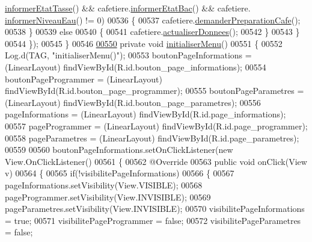 \begin{DoxyCode}
      \hyperlink{classcom_1_1example_1_1ekawa_1_1_cafetiere_ae3c04cc0258cbe554eee5894655c379e}{informerEtatTasse}() && cafetiere.\hyperlink{classcom_1_1example_1_1ekawa_1_1_cafetiere_a1e5aad72cec77a755c8b70eb1be5e6e5}{informerEtatBac}() && cafetiere.
      \hyperlink{classcom_1_1example_1_1ekawa_1_1_cafetiere_ab8113e922056276f8097744991ca76b6}{informerNiveauEau}() != 0)
00536                 \{
00537                     cafetiere.\hyperlink{classcom_1_1example_1_1ekawa_1_1_cafetiere_a76eb3aa494815ac3b43371e21de21db3}{demanderPreparationCafe}();
00538                 \}
00539                 \textcolor{keywordflow}{else}
00540                 \{
00541                     cafetiere.\hyperlink{classcom_1_1example_1_1ekawa_1_1_cafetiere_a1c6b2ea0e069cda876260e18ea8f6e84}{actualiserDonnees}();
00542                 \}
00543             \}
00544         \});
00545     \}
00546 
\hyperlink{classcom_1_1example_1_1ekawa_1_1_ihm_a60968cecc69df879805b531a5f2ae19c}{00550}     \textcolor{keyword}{private} \textcolor{keywordtype}{void} \hyperlink{classcom_1_1example_1_1ekawa_1_1_ihm_a60968cecc69df879805b531a5f2ae19c}{initialiserMenu}()
00551     \{
00552         Log.d(TAG, \textcolor{stringliteral}{"initialiserMenu()"});
00553         boutonPageInformations = (LinearLayout) findViewById(R.id.bouton\_page\_informations);
00554         boutonPageProgrammer = (LinearLayout) findViewById(R.id.bouton\_page\_programmer);
00555         boutonPageParametres = (LinearLayout) findViewById(R.id.bouton\_page\_parametres);
00556         pageInformations = (LinearLayout) findViewById(R.id.page\_informations);
00557         pageProgrammer = (LinearLayout) findViewById(R.id.page\_programmer);
00558         pageParametres = (LinearLayout) findViewById(R.id.page\_parametres);
00559 
00560         boutonPageInformations.setOnClickListener(\textcolor{keyword}{new} View.OnClickListener()
00561         \{
00562             @Override
00563             \textcolor{keyword}{public} \textcolor{keywordtype}{void} onClick(View v)
00564             \{
00565                 \textcolor{keywordflow}{if}(!visibilitePageInformations)
00566                 \{
00567                     pageInformations.setVisibility(View.VISIBLE);
00568                     pageProgrammer.setVisibility(View.INVISIBLE);
00569                     pageParametres.setVisibility(View.INVISIBLE);
00570                     visibilitePageInformations = \textcolor{keyword}{true};
00571                     visibilitePageProgrammer = \textcolor{keyword}{false};
00572                     visibilitePageParametres = \textcolor{keyword}{false};

\end{DoxyCode}

